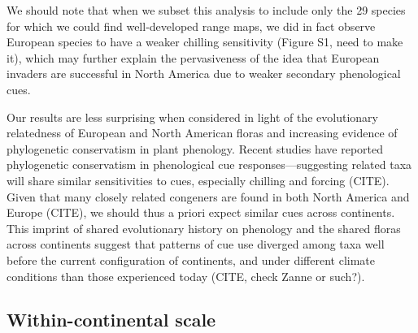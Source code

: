 \documentclass[12pt]{article}
\begin{document}
We should note that when we subset this analysis to include only the 29 species for which we could find well-developed range maps, we did in fact observe European species to have a weaker chilling sensitivity (Figure S1, need to make it), which may further explain the pervasiveness of the idea that European invaders are successful in North America due to weaker secondary phenological cues.

Our results are less surprising when considered in light of the evolutionary relatedness of European and North American floras and increasing evidence of phylogenetic conservatism in plant phenology. Recent studies have reported phylogenetic conservatism in phenological cue responses---suggesting related taxa will share similar sensitivities to cues, especially chilling and forcing (CITE). Given that many closely related congeners are found in both North America and Europe (CITE), we should thus a priori expect similar cues across continents. This imprint of shared evolutionary history on phenology and the shared floras across continents suggest that patterns of cue use diverged among taxa well before the current configuration of continents, and under different climate conditions than those experienced today (CITE, check Zanne or such?). %

\subsection{Within-continental scale}
\end{document}
